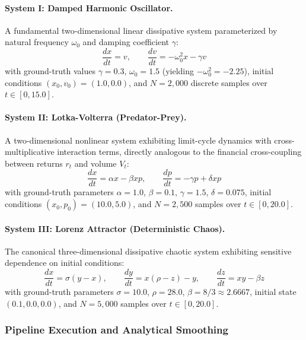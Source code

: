 \documentclass[11pt,a4paper]{article}
\begin{document}
\paragraph{System I: Damped Harmonic Oscillator.}
A fundamental two-dimensional linear dissipative system parameterized by natural frequency $\omega_0$ and damping coefficient $\gamma$:
\begin{equation}
    \frac{dx}{dt} = v, \qquad \frac{dv}{dt} = -\omega_0^2 x - \gamma v
    \label{eq:harmonic}
\end{equation}
with ground-truth values $\gamma = 0.3$, $\omega_0 = 1.5$ (yielding $-\omega_0^2 = -2.25$), initial conditions $(x_0, v_0) = (1.0, 0.0)$, and $N = 2{,}000$ discrete samples over $t \in [0, 15.0]$.

\paragraph{System II: Lotka-Volterra (Predator-Prey).}
A two-dimensional nonlinear system exhibiting limit-cycle dynamics with cross-multiplicative interaction terms, directly analogous to the financial cross-coupling between returns $r_t$ and volume $V_t$:
\begin{equation}
    \frac{dx}{dt} = \alpha x - \beta x p, \qquad \frac{dp}{dt} = -\gamma p + \delta x p
    \label{eq:lotka_volterra}
\end{equation}
with ground-truth parameters $\alpha = 1.0$, $\beta = 0.1$, $\gamma = 1.5$, $\delta = 0.075$, initial conditions $(x_0, p_0) = (10.0, 5.0)$, and $N = 2{,}500$ samples over $t \in [0, 20.0]$.

\paragraph{System III: Lorenz Attractor (Deterministic Chaos).}
The canonical three-dimensional dissipative chaotic system exhibiting sensitive dependence on initial conditions:
\begin{equation}
    \frac{dx}{dt} = \sigma(y - x), \qquad \frac{dy}{dt} = x(\rho - z) - y, \qquad \frac{dz}{dt} = xy - \beta z
    \label{eq:lorenz}
\end{equation}
with ground-truth parameters $\sigma = 10.0$, $\rho = 28.0$, $\beta = 8/3 \approx 2.6667$, initial state $(0.1, 0.0, 0.0)$, and $N = 5{,}000$ samples over $t \in [0, 20.0]$.

\subsubsection{Pipeline Execution and Analytical Smoothing}
\end{document}

